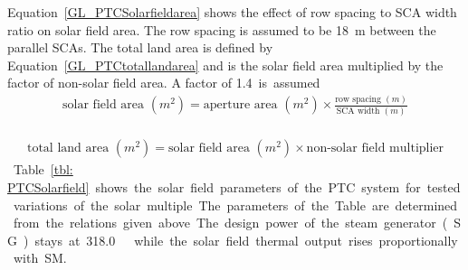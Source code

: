 Equation~\ref{GL_PTCSolarfieldarea} shows the effect of row spacing to SCA width ratio on solar field area. The row spacing is assumed to be \SI{18}{m} between the parallel SCAs. The total land area is defined by Equation~\ref{GL_PTCtotallandarea} and is the solar field area multiplied by the factor of non-solar field area. A factor of \SI{1.4} is assumed \cite{NREL2015a}.

\begin{align}
\textrm{solar field area }(m^2) =\textrm{aperture area }(m^2) \times \frac{\textrm{row spacing }(m)}{ \textrm{SCA width }(m)} \label{GL_PTCSolarfieldarea}
\end{align}
\begin{align}
\textrm{total land area }(m^2) =\textrm{solar field area }(m^2) \times  \textrm{non-solar field multiplier}\label{GL_PTCtotallandarea}
\end{align}
Table~\ref{tbl: PTCSolarfield} shows the solar field parameters of the PTC system for tested variations of the solar multiple. The parameters of the Table are determined from the relations given above. The design power of the steam generator (SG) stays at \SI{318.0}{\mega\wattth} while the solar field thermal output rises proportionally with SM. 

